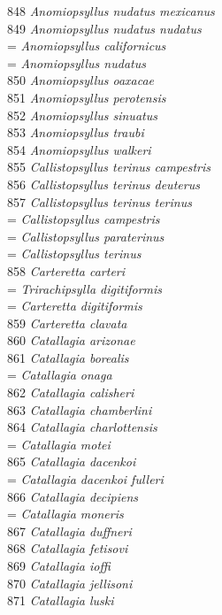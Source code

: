 \documentclass[
]{article}
\begin{document}
848 \emph{Anomiopsyllus nudatus mexicanus}\\
849 \emph{Anomiopsyllus nudatus nudatus}\\
= \emph{Anomiopsyllus californicus}\\
= \emph{Anomiopsyllus nudatus}\\
850 \emph{Anomiopsyllus oaxacae}\\
851 \emph{Anomiopsyllus perotensis}\\
852 \emph{Anomiopsyllus sinuatus}\\
853 \emph{Anomiopsyllus traubi}\\
854 \emph{Anomiopsyllus walkeri}\\
855 \emph{Callistopsyllus terinus campestris}\\
856 \emph{Callistopsyllus terinus deuterus}\\
857 \emph{Callistopsyllus terinus terinus}\\
= \emph{Callistopsyllus campestris}\\
= \emph{Callistopsyllus paraterinus}\\
= \emph{Callistopsyllus terinus}\\
858 \emph{Carteretta carteri}\\
= \emph{Trirachipsylla digitiformis}\\
= \emph{Carteretta digitiformis}\\
859 \emph{Carteretta clavata}\\
860 \emph{Catallagia arizonae}\\
861 \emph{Catallagia borealis}\\
= \emph{Catallagia onaga}\\
862 \emph{Catallagia calisheri}\\
863 \emph{Catallagia chamberlini}\\
864 \emph{Catallagia charlottensis}\\
= \emph{Catallagia motei}\\
865 \emph{Catallagia dacenkoi}\\
= \emph{Catallagia dacenkoi fulleri}\\
866 \emph{Catallagia decipiens}\\
= \emph{Catallagia moneris}\\
867 \emph{Catallagia duffneri}\\
868 \emph{Catallagia fetisovi}\\
869 \emph{Catallagia ioffi}\\
870 \emph{Catallagia jellisoni}\\
871 \emph{Catallagia luski}\\
\end{document}

